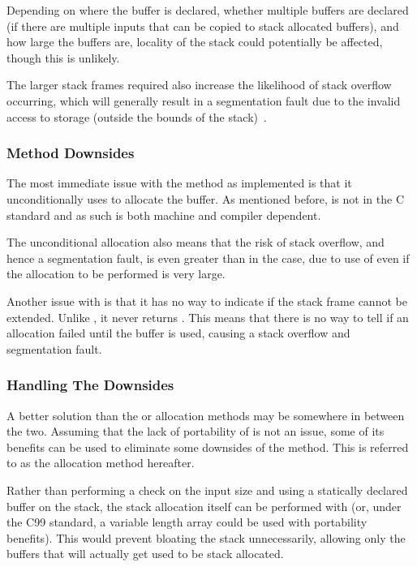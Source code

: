 Depending on where the buffer is declared, whether multiple buffers are declared (if there are multiple inputs that can be copied to stack allocated buffers), and how large the buffers are, locality of the stack could potentially be affected, though this is unlikely.

The larger stack frames required also increase the likelihood of stack overflow occurring, which will generally result in a segmentation fault due to the invalid access to storage (outside the bounds of the stack)~\cite{c11std}.

\subsubsection{ Method Downsides}

The most immediate issue with the  method as implemented is that it unconditionally uses  to allocate the buffer. As mentioned before,  is not in the C standard and as such is both machine and compiler dependent.

The unconditional allocation also means that the risk of stack overflow, and hence a segmentation fault, is even greater than in the  case, due to use of  even if the allocation to be performed is very large.

Another issue with  is that it has no way to indicate if the stack frame cannot be extended. Unlike \malloc{}, it never returns . This means that there is no way to tell if an allocation failed until the buffer is used, causing a stack overflow and segmentation fault.

\subsubsection{Handling The Downsides}

A better solution than the  or  allocation methods may be somewhere in between the two. Assuming that the lack of portability of  is not an issue, some of its benefits can be used to eliminate some downsides of the  method. This is referred to as the  allocation method hereafter.

Rather than performing a check on the input size and using a statically declared buffer on the stack, the stack allocation itself can be performed with  (or, under the C99 standard, a variable length array could be used with portability benefits). This would prevent bloating the stack unnecessarily, allowing only the buffers that will actually get used to be stack allocated.

